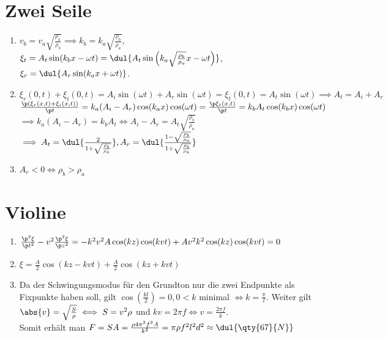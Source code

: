 \documentclass{article}
\begin{document}
\section{Zwei Seile}
\begin{enumerate}[label=\alph*)]
    \item $v_b = v_a \sqrt{\frac{\rho_a}{\rho_b}} \implies k_b = k_a \sqrt{\frac{\rho_b}{\rho_a}}$, 
    $\xi_t = A_t \sin(k_bx - \omega t) = \dul{A_t \sin\left(k_a \sqrt{\frac{\rho_b}{\rho_a}} x - \omega t\right)}$, \\
    $\xi_r = \dul{A_r \sin(k_a x + \omega t)}$. \\

    \item $\xi_r(0, t) + \xi_i(0, t) = A_i \sin(\omega t) + A_r \sin(\omega t) = \xi_t(0, t) = A_t \sin(\omega t) \implies A_t = A_i + A_r$ \\
    $\frac{\p (\xi_r(x, t) + \xi_i(x, t))}{\p t} = k_a (A_i - A_r) \cos(k_a x) \cos(\omega t) = \frac{\p \xi_t(x, t)}{\p t} = k_b A_t \cos(k_b x) \cos(\omega t)$ \\
    $\implies k_a(A_i - A_r) = k_b A_t \iff A_i - A_r = A_t \sqrt{\frac{\rho_b}{\rho_a}}$ \\
    $\implies A_t = \dul{\frac{2}{1 + \sqrt{\frac{\rho_b}{\rho_a}}}}, A_r = \dul{\frac{1 - \sqrt{\frac{\rho_b}{\rho_a}}}{1 + \sqrt{\frac{\rho_b}{\rho_a}}}}$

    \item $A_r < 0 \iff \rho_b > \rho_a$
    
\end{enumerate}

\section{Violine} 
\begin{enumerate}[label=\alph*)]
    \item $\frac{\p^2 \xi}{\p t^2} - v^2 \frac{\p^2 \xi}{\p z^2} 
    = - k^2 v^2 A \cos(kz) \cos(kvt) + A v^2 k^2 \cos(kz) \cos(kvt) = 0$

    \item $\xi = \frac{A}{2} \cos(kz - kvt) + \frac{A}{2} \cos(kz + kvt)$
    
    \item Da der Schwingungsmodus für den Grundton nur die zwei Endpunkte als Fixpunkte haben soll, gilt $\cos \left(\frac{kl}{2}\right) = 0, 0 < k$ minimal $\iff k = \frac{\pi}{l}$. 
    Weiter gilt $\abs{v} = \sqrt{\frac{S}{\rho}} \iff S = v^2 \rho$ und $kv = 2 \pi f \iff v = \frac{2 \pi f}{k}$. \\ 
    Somit erhält man $F = SA = \frac{\rho 4 \pi^2 f^2 A}{k^2} = \pi \rho f^2 l^2 d^2 \approx \dul{\qty{67}{N}}$
\end{enumerate}
\end{document}
